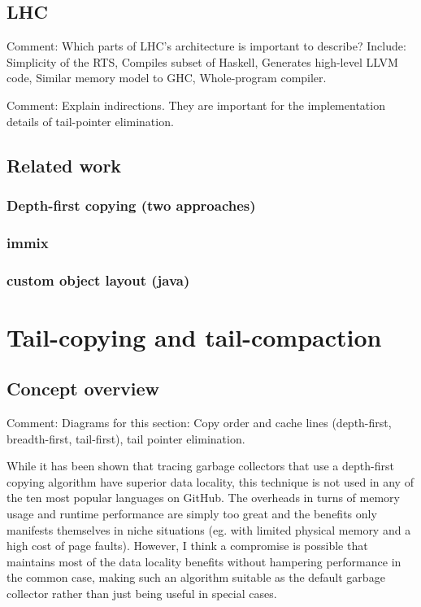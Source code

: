 \documentclass[a4paper,oneside]{memoir}
\newcommand{\makecomment}[1]{{\color{red} Comment: #1}}
\begin{document}
\section{LHC}
\makecomment{Which parts of LHC's architecture is important to describe? \cite{LHC}
Include: Simplicity of the RTS, Compiles subset of Haskell, Generates high-level
LLVM code, Similar memory model to GHC, Whole-program compiler.}

\makecomment{Explain indirections. They are important for the implementation
details of tail-pointer elimination.}

\section{Related work}
\subsection{Depth-first copying (two approaches)}
\subsection{immix}
\subsection{custom object layout (java)}

\chapter{Tail-copying and tail-compaction}

\section{Concept overview}

\makecomment{Diagrams for this section: Copy order and cache lines (depth-first,
breadth-first, tail-first), tail pointer elimination.}

While it has been shown that tracing garbage collectors that use a depth-first
copying algorithm have superior data locality, this technique is not used in any
of the ten most popular languages on GitHub. The overheads in turns of memory
usage and runtime performance are simply too great and the benefits only
manifests themselves in niche situations (eg. with limited physical memory and
a high cost of page faults). However, I think a compromise is possible that
maintains most of the data locality benefits without hampering performance in
the common case, making such an algorithm suitable as the default garbage
collector rather than just being useful in special cases.
\end{document}
